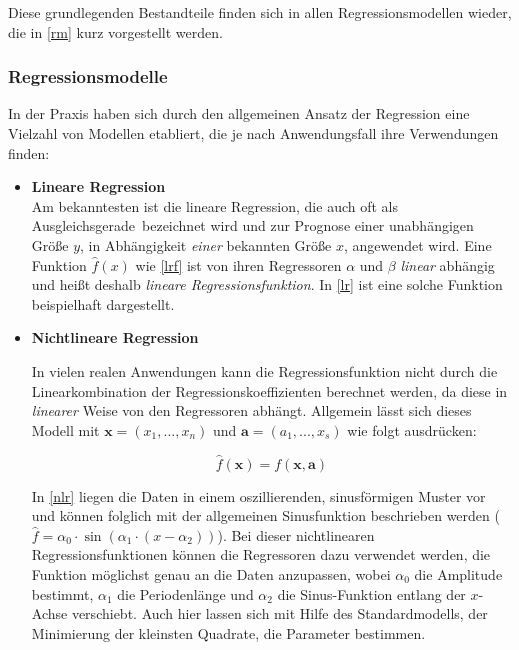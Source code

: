 Diese grundlegenden Bestandteile finden sich in allen Regressionsmodellen wieder, die in \vref{rm} kurz vorgestellt werden. 


\subsubsection{Regressionsmodelle}\label{rm}
In der Praxis haben sich durch den allgemeinen Ansatz der Regression eine Vielzahl von Modellen etabliert, die je nach Anwendungsfall ihre Verwendungen finden:


\begin{itemize}


\item \textbf{Lineare Regression}
\\ Am bekanntesten ist die lineare Regression, die auch oft als \glqq Ausgleichsgerade\grqq~bezeichnet wird und zur Prognose einer unabhängigen Größe $y$, in Abhängigkeit \textit{einer} bekannten Größe $x$, angewendet wird. Eine Funktion $\hat{f}(x)$ wie \vref{lrf} ist von ihren Regressoren $\alpha$ und $\beta$ \textit{linear} abhängig und heißt deshalb \textit{lineare Regressionsfunktion}. In \vref{lr} ist eine solche Funktion beispielhaft dargestellt.




\item \textbf{Nichtlineare Regression}

In vielen realen Anwendungen kann die Regressionsfunktion nicht durch die Linearkombination der Regressionskoeffizienten berechnet werden, da diese in \textit{linearer} Weise von den Regressoren abhängt. Allgemein lässt sich dieses Modell mit $\boldsymbol{x} = (x_1,...,x_n)$ und $\boldsymbol{a} = (a_1,...,x_s)$ wie folgt ausdrücken:

\begin{equation}
	\hat{f}(\boldsymbol{x}) = f(\boldsymbol{x},\boldsymbol{a})
\end{equation}

In \vref{nlr} liegen die Daten in einem oszillierenden, sinusförmigen Muster vor und können folglich mit der allgemeinen Sinusfunktion beschrieben werden ($\hat{f} = \alpha_0 \cdot \sin(\alpha_1 \cdot (x-\alpha_2))$). Bei dieser nichtlinearen Regressionsfunktionen können die Regressoren dazu verwendet werden, die Funktion möglichst genau an die Daten anzupassen, wobei $\alpha_0$ die Amplitude bestimmt, $\alpha_1$ die Periodenlänge und $\alpha_2$ die Sinus-Funktion entlang der $x$-Achse verschiebt. Auch hier lassen sich mit Hilfe des Standardmodells, der Minimierung der kleinsten Quadrate, die Parameter bestimmen.


\end{itemize}

